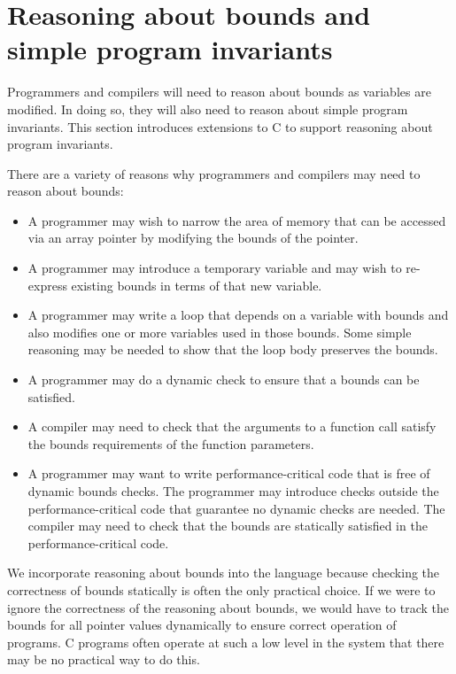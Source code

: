 
\chapter{Reasoning about bounds and simple program invariants}

Programmers and compilers will need to reason about bounds as variables
are modified. In doing so, they will also need to reason about simple
program invariants. This section introduces extensions to C to support
reasoning about program invariants.

There are a variety of reasons why programmers and compilers may need to
reason about bounds:

\begin{itemize}
\item
  A programmer may wish to narrow the area of memory that can be
  accessed via an array pointer by modifying the bounds of the pointer.
\item
  A programmer may introduce a temporary variable and may wish to
  re-express existing bounds in terms of that new variable.
\item
  A programmer may write a loop that depends on a variable with bounds
  and also modifies one or more variables used in those bounds. Some
  simple reasoning may be needed to show that the loop body preserves
  the bounds.
\item
  A programmer may do a dynamic check to ensure that a bounds can be
  satisfied.
\item
  A compiler may need to check that the arguments to a function call
  satisfy the bounds requirements of the function parameters.
\item
  A programmer may want to write performance-critical code that is free
  of dynamic bounds checks. The programmer may introduce checks outside
  the performance-critical code that guarantee no dynamic checks are
  needed. The compiler may need to check that the bounds are statically
  satisfied in the performance-critical code.
\end{itemize}

We incorporate reasoning about bounds into the language because checking
the correctness of bounds statically is often the only practical choice.
If we were to ignore the correctness of the reasoning about bounds, we
would have to track the bounds for all pointer values dynamically to
ensure correct operation of programs. C programs often operate at such a
low level in the system that there may be no practical way to do this.

